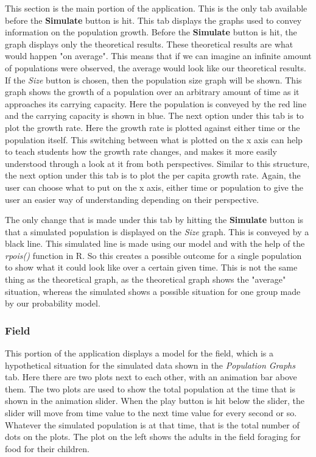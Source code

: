 \documentclass{article}\usepackage[]{graphicx}\usepackage[]{color}
\begin{document}
This section is the main portion of the application. This is the only tab available before the \textbf{Simulate} button is hit. This tab displays the graphs used to convey information on the population growth. Before the \textbf{Simulate} button is hit, the graph displays only the theoretical results. These theoretical results are what would happen "on average". This means that if we can imagine an infinite amount of populations were observed, the average would look like our theoretical results. If the \textit{Size} button is chosen, then the population size graph will be shown. This graph shows the growth of a population over an arbitrary amount of time as it approaches its carrying capacity. Here the population is conveyed by the red line and the carrying capacity is shown in blue. The next option under this tab is to plot the growth rate. Here the growth rate is plotted against either time or the population itself. This switching between what is plotted on the x axis can help to teach students how the growth rate changes, and makes it more easily understood through a look at it from both perspectives. Similar to this structure, the next option under this tab is to plot the per capita growth rate. Again, the user can choose what to put on the x axis, either time or population to give the user an easier way of understanding depending on their perspective.

The only change that is made under this tab by hitting the \textbf{Simulate} button is that a simulated population is displayed on the \textit{Size} graph. This is conveyed by a black line. This simulated line is made using our model and with the help of the \textit{rpois()} function in R. So this creates a possible outcome for a single population to show what it could look like over a certain given time. This is not the same thing as the theoretical graph, as the theoretical graph shows the "average" situation, whereas the simulated shows a possible situation for one group made by our probability model. 

\subsubsection{Field}

This portion of the application displays a model for the field, which is a hypothetical situation for the simulated data shown in the \textit{Population Graphs} tab. Here there are two plots next to each other, with an animation bar above them. The two plots are used to show the total population at the time that is shown in the animation slider. When the play button is hit below the slider, the slider will move from time value to the next time value for every second or so. Whatever the simulated population is at that time, that is the total number of dots on the plots. The plot on the left shows the adults in the field foraging for food for their children. 
\end{document}
